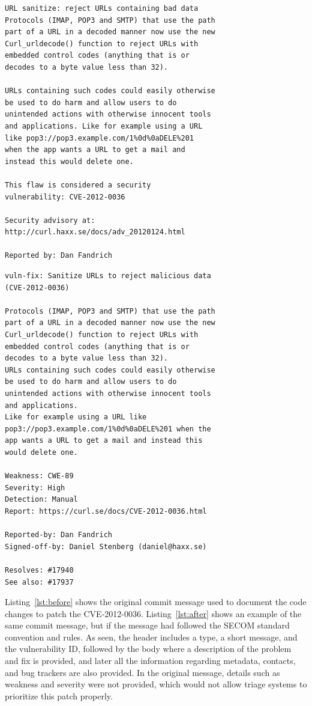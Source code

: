 \begin{lstlisting}[caption={Original commit message to fix CVE-2012-0036},label={lst:before},basicstyle=\scriptsize,frame=tlrb]
URL sanitize: reject URLs containing bad data
Protocols (IMAP, POP3 and SMTP) that use the path 
part of a URL in a decoded manner now use the new 
Curl_urldecode() function to reject URLs with 
embedded control codes (anything that is or 
decodes to a byte value less than 32).

URLs containing such codes could easily otherwise 
be used to do harm and allow users to do 
unintended actions with otherwise innocent tools 
and applications. Like for example using a URL 
like pop3://pop3.example.com/1%0d%0aDELE%201 
when the app wants a URL to get a mail and 
instead this would delete one.

This flaw is considered a security 
vulnerability: CVE-2012-0036

Security advisory at: 
http://curl.haxx.se/docs/adv_20120124.html

Reported by: Dan Fandrich
\end{lstlisting}

\begin{lstlisting}[caption={Commit message to fix CVE-2012-0036 (after SECOM's application)},label={lst:after},basicstyle=\scriptsize,frame=tlrb]
vuln-fix: Sanitize URLs to reject malicious data 
(CVE-2012-0036)

Protocols (IMAP, POP3 and SMTP) that use the path 
part of a URL in a decoded manner now use the new 
Curl_urldecode() function to reject URLs with 
embedded control codes (anything that is or 
decodes to a byte value less than 32).
URLs containing such codes could easily otherwise 
be used to do harm and allow users to do 
unintended actions with otherwise innocent tools 
and applications.
Like for example using a URL like 
pop3://pop3.example.com/1%0d%0aDELE%201 when the 
app wants a URL to get a mail and instead this 
would delete one.

Weakness: CWE-89
Severity: High
Detection: Manual
Report: https://curl.se/docs/CVE-2012-0036.html

Reported-by: Dan Fandrich
Signed-off-by: Daniel Stenberg (daniel@haxx.se)

Resolves: #17940
See also: #17937
\end{lstlisting}

Listing~\ref{lst:before} shows the original commit message used to document the code changes
to patch the CVE-2012-0036. Listing~\ref{lst:after} shows an example of the same commit message, 
but if the message had followed the SECOM standard convention and rules. As seen, the header
includes a type, a short message, and the vulnerability ID, followed by the body where a description
of the problem and fix is provided, and later all the information regarding metadata, contacts, and bug trackers are also provided. In the original message, details such as weakness and severity were not provided, which would not allow triage systems to prioritize this patch properly.

